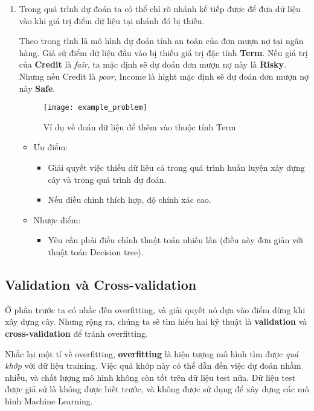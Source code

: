 \documentclass[../main-report.tex]{subfiles}
\begin{document}
\begin{enumerate}
\item Trong quá trình dự đoán ta có thể chỉ rõ nhánh kế tiếp được để đưa dữ liệu vào khi giá trị điểm dữ liệu tại nhánh đó bị thiếu.

\begin{example}
Theo trong tình là mô hình dự đoán tính an toàn của đơn mượn nợ tại ngân hàng. Giả sử điểm dữ liệu đầu vào bị thiếu giá trị đặc tính \textbf{Term}. Nếu giá trị của \textbf{Credit} là \emph{fair}, ta mặc định sẽ dự đoán đơn mượn nợ này là \textbf{Risky}. Nhưng nếu Credit là \emph{poor}, Income là hight mặc định sẽ dự đoán đơn mượn nợ này \textbf{Safe}.
\end{example}

\begin{figure}[ht!]
\centering\texttt{[image: example\_problem]}
\caption{Ví dụ về đoán dữ liệu để thêm vào thuộc tính Term}
\end{figure}

\begin{itemize}
\item Ưu điểm:
\begin{itemize}
\item Giải quyết việc thiếu dữ liêu cả trong quá trình huấn luyện xây dựng cây và trong quá trình dự đoán.
\item Nếu điều chỉnh thích hợp, độ chính xác cao.
\end{itemize}
\item Nhược điểm:
\begin{itemize}
\item Yêu cầu phải điều chỉnh thuật toán nhiều lần (điều này đơn giản với thuật toán Decision tree).
\end{itemize}
\end{itemize}
\end{enumerate}

\subsection{Validation và Cross-validation}
Ở phần trước ta có nhắc đến overfitting, và giải quyết nó dựa vào điểm dừng khi xây dựng cây. Nhưng rộng ra, chúng ta sẽ tìm hiểu hai kỹ thuật là \textbf{validation} và \textbf{cross-validation} để tránh overfitting.

Nhắc lại một tí về overfitting, \textbf{overfitting} là hiện tượng mô hình tìm được \emph{quá khớp} với dữ liệu training. Việc quá khớp này có thể dẫn đến việc dự đoán nhầm nhiễu, và chất lượng mô hình không còn tốt trên dữ liệu test nữa. Dữ liệu test được giả sử là không được biết trước, và không được sử dụng để xây dựng các mô hình Machine Learning.
\end{document}
